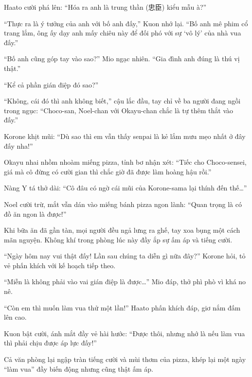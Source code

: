 \documentclass[../main.tex]{subfiles}
\begin{document}
Haato cười phá lên: ``Hóa ra anh là trung thần (忠臣) kiểu mẫu à?''

``Thực ra là ý tưởng của anh với bố anh đấy,'' Kuon nhớ lại. ``Bố anh mê phim cổ trang lắm, ông ấy dạy anh mấy chiêu này để đối phó với sự `vô lý' của nhà vua đấy.''

``Bố anh cũng góp tay vào sao?'' Mio ngạc nhiên. ``Gia đình anh đúng là thú vị thật.''

``Kể cả phần gián điệp đó sao?''

``Không, cái đó thì anh không biết,'' cậu lắc đầu, tay chỉ về ba người đang ngồi trong ngục: ``Choco-san, Noel-chan với Okayu-chan chắc là tự thêm thắt vào đấy.''

Korone khịt mũi: ``Dù sao thì em vẫn thấy senpai là kẻ lắm mưu mẹo nhất ở đây đấy nha!''

Okayu nhai nhồm nhoàm miếng pizza, tỉnh bơ nhận xét: ``Tiếc cho Choco-sensei, giá mà cô đừng có cười gian thì chắc giờ đã được làm hoàng hậu rồi.''

Nàng Y tá thở dài: ``Cô đâu có ngờ cái mũi của Korone-sama lại thính đến thế\dots''

Noel cười trừ, mắt vẫn dán vào miếng bánh pizza ngon lành: ``Quan trọng là có đồ ăn ngon là được!''

Khi bữa ăn đã gần tàn, mọi người đều ngả lưng ra ghế, tay xoa bụng một cách mãn nguyện. Không khí trong phòng lúc này đầy ắp sự ấm áp và tiếng cười.

``Ngày hôm nay vui thật đấy! Lần sau chúng ta diễn gì nữa đây?'' Korone hỏi, tỏ vẻ phấn khích với kế hoạch tiếp theo.

``Miễn là không phải vào vai gián điệp là được\dots'' Mio đáp, thở phì phò vì khá no nê.

``Còn em thì muốn làm vua thử một lần!'' Haato phấn khích đáp, giơ nắm đấm lên cao.

Kuon bật cười, ánh mắt đầy vẻ hài hước: ``Được thôi, nhưng nhớ là nếu làm vua thì phải chịu được áp lực đấy!''

Cả văn phòng lại ngập tràn tiếng cười và mùi thơm của pizza, khép lại một ngày ``làm vua'' đầy biến động nhưng cũng thật ấm áp.
\end{document}
